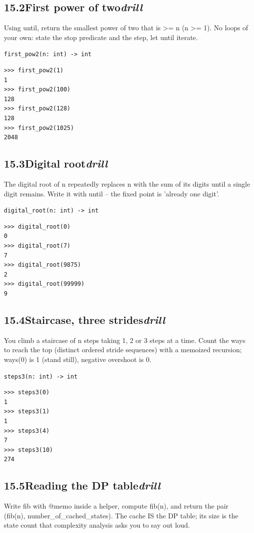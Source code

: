 \documentclass[10pt,letterpaper]{book}
\begin{document}
\subsection*{15.2\quad First power of two\hfill\textnormal{\textit{drill}}}
Using until, return the smallest power of two that is >= n (n >= 1). No loops of your own: state the stop predicate and the step, let until iterate.

\noindent\texttt{first\_pow2(n: int) -> int}
\begin{lstlisting}[style=ex]
>>> first_pow2(1)
1
>>> first_pow2(100)
128
>>> first_pow2(128)
128
>>> first_pow2(1025)
2048
\end{lstlisting}
\subsection*{15.3\quad Digital root\hfill\textnormal{\textit{drill}}}
The digital root of n repeatedly replaces n with the sum of its digits until a single digit remains. Write it with until -- the fixed point is 'already one digit'.

\noindent\texttt{digital\_root(n: int) -> int}
\begin{lstlisting}[style=ex]
>>> digital_root(0)
0
>>> digital_root(7)
7
>>> digital_root(9875)
2
>>> digital_root(99999)
9
\end{lstlisting}
\subsection*{15.4\quad Staircase, three strides\hfill\textnormal{\textit{drill}}}
You climb a staircase of n steps taking 1, 2 or 3 steps at a time. Count the ways to reach the top (distinct ordered stride sequences) with a memoized recursion; ways(0) is 1 (stand still), negative overshoot is 0.

\noindent\texttt{steps3(n: int) -> int}
\begin{lstlisting}[style=ex]
>>> steps3(0)
1
>>> steps3(1)
1
>>> steps3(4)
7
>>> steps3(10)
274
\end{lstlisting}
\subsection*{15.5\quad Reading the DP table\hfill\textnormal{\textit{drill}}}
Write fib with @memo inside a helper, compute fib(n), and return the pair (fib(n), number\_of\_cached\_states). The cache IS the DP table; its size is the state count that complexity analysis asks you to say out loud.
\end{document}
